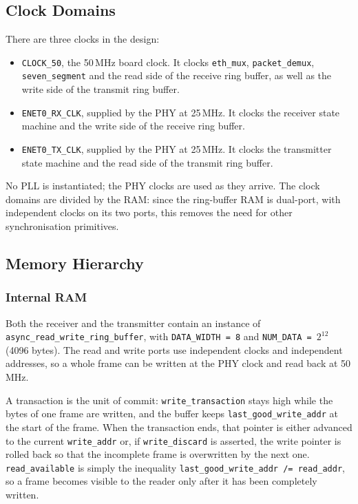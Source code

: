 \documentclass[11pt,a4paper]{article}
\begin{document}
\subsection{Clock Domains}
There are three clocks in the design:
\begin{itemize}
    \item \texttt{CLOCK\_50}, the 50\,MHz board clock. It clocks \texttt{eth\_mux}, \texttt{packet\_demux}, \texttt{seven\_segment} and the read side of the receive ring buffer, as well as the write side of the transmit ring buffer.
    \item \texttt{ENET0\_RX\_CLK}, supplied by the PHY at 25\,MHz. It clocks the receiver state machine and the write side of the receive ring buffer.
    \item \texttt{ENET0\_TX\_CLK}, supplied by the PHY at 25\,MHz. It clocks the transmitter state machine and the read side of the transmit ring buffer.
\end{itemize}

No PLL is instantiated; the PHY clocks are used as they arrive. The clock domains are divided by the RAM: since the ring-buffer RAM is dual-port, with independent clocks on its two ports, this removes the need for other synchronisation primitives.

\subsection{Memory Hierarchy}

\subsubsection{Internal RAM}
Both the receiver and the transmitter contain an instance of \texttt{async\_read\_write\_ring\_buffer}, with \texttt{DATA\_WIDTH = 8} and \texttt{NUM\_DATA = $2^{12}$} (4096 bytes). The read and write ports use independent clocks and independent addresses, so a whole frame can be written at the PHY clock and read back at 50\,MHz.

A transaction is the unit of commit: \texttt{write\_transaction} stays high while the bytes of one frame are written, and the buffer keeps \texttt{last\_good\_write\_addr} at the start of the frame. When the transaction ends, that pointer is either advanced to the current \texttt{write\_addr} or, if \texttt{write\_discard} is asserted, the write pointer is rolled back so that the incomplete frame is overwritten by the next one. \texttt{read\_available} is simply the inequality \texttt{last\_good\_write\_addr /= read\_addr}, so a frame becomes visible to the reader only after it has been completely written.
\end{document}
